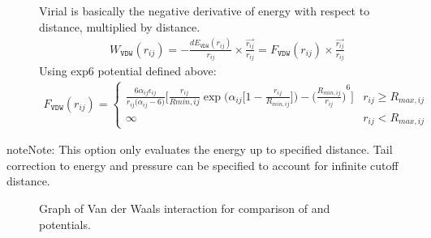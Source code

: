 \documentclass[letterpaper,10pt,english]{sphinxmanual}
\begin{document}
\begin{description}
\item[{}] \leavevmode
\sphinxAtStartPar
Virial is basically the negative derivative of energy with respect to distance, multiplied by distance.
\begin{equation*}
\begin{split}W_{\texttt{VDW}}(r_{ij}) = -\frac{dE_{\texttt{VDW}}(r_{ij})}{r_{ij}}\times \frac{\overrightarrow{r_{ij}}}{{r_{ij}}} = F_{\texttt{VDW}}(r_{ij}) \times \frac{\overrightarrow{r_{ij}}}{{r_{ij}}}\end{split}
\end{equation*}
\sphinxAtStartPar
Using exp\sphinxhyphen{}6 potential defined above:
\begin{equation*}
\begin{split}F_{\texttt{VDW}}(r_{ij}) =
\begin{cases}
  \frac{6 \alpha_{ij}\epsilon_{ij}}{r_{ij}\big(\alpha_{ij}-6\big)} \bigg[\frac{r_{ij}}{R{min,ij}} \exp\bigg(\alpha_{ij} \bigg[1-\frac{r_{ij}}{R_{min,ij}} \bigg]\bigg) - {\bigg(\frac{R_{min,ij}}{r_{ij}}\bigg)}^6 \bigg] &  r_{ij} \geq R_{max,ij} \\
  \infty & r_{ij} < R_{max,ij}
\end{cases}\end{split}
\end{equation*}
\end{description}

\begin{sphinxadmonition}{note}{Note:}
\sphinxAtStartPar
This option only evaluates the energy up to specified  distance. Tail correction to energy and pressure can be specified to account for infinite cutoff distance.
\end{sphinxadmonition}

\begin{figure}[htbp]
\centering
\capstart

\noindent{}
\caption{Graph of Van der Waals interaction for comparison of  and  potentials.}\label{\detokenize{vdw_energy:id1}}\end{figure}
\end{document}
